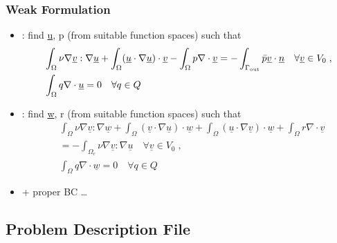 \documentclass[10pt,t]{beamer}
\newcommand{\blue}[1]{{\color{blue}{#1}}}
\newcommand{\lblue}[1]{{\color{lblue}{#1}}}
\newcommand{\ul}[1]{\underline{#1}}
\begin{document}
\begin{frame}
  \frametitle{Weak Formulation}
  \begin{itemize}
  \item<1-> \blue{state problem}: find \ul{u}, p (from suitable function
    spaces) such that
    \begin{equation}\label{eq-ns-34a}
      \begin{split}
        &\int_\Omega \nu \nabla \ul{v} : \nabla \ul{u} + \int_\Omega (\ul{u}
        \cdot \nabla \ul{u})\cdot \ul{v} - \int_\Omega p \nabla \cdot \ul{v} =
        - \int_{\Gamma_{\rm out}} \bar{p} \ul{v} \cdot \ul{n} \quad \forall
        \ul{v} \in V_0 \;,
        \\
        & \int_{\Omega} q \nabla \cdot \ul{u} = 0 \quad \forall q \in Q
      \end{split}
    \end{equation}
  \item<2-> \lblue{adjoint equations}: find \ul{w}, r (from suitable function
    spaces) such that
    \begin{equation}\label{eq-ns-34b}
      \begin{split}
        & \int_\Omega \nu
          \nabla \ul{v} : \nabla \ul{w} + \int_\Omega (\ul{v} \cdot \nabla
          \ul{u})\cdot \ul{w} + \int_\Omega (\ul{u} \cdot \nabla
          \ul{v})\cdot \ul{w} + \int_\Omega r \nabla \cdot \ul{v} \\
        & = - \int_{\Omega_c} \nu \nabla \ul{v} : \nabla \ul{u} \quad \forall
        \ul{v} \in V_0 \;, \\
        & \int_{\Omega} q \nabla \cdot \ul{w} = 0\quad \forall q \in Q
      \end{split}
    \end{equation}
  \item<3-> + proper BC \dots
  \end{itemize}
\end{frame}

\subsection{Problem Description File}
\end{document}
